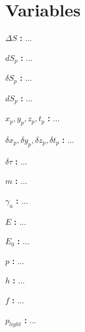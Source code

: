 \section{Variables}

\noindent ${\Delta S}$ \textbf{:}
...

\noindent ${dS_p}$ \textbf{:}
...

\noindent ${\delta S_p}$ \textbf{:}
...

\noindent ${dS_p}$ \textbf{:}
...

\noindent ${x_p},{y_p},{z_p},{t_p}$ \textbf{:}
...

\noindent ${\delta x_p},{\delta y_p},{\delta z_p},{\delta t_p}$ \textbf{:}
...

\noindent ${\delta\tau}$ \textbf{:}
...

\noindent ${m}$ \textbf{:}
...

\noindent ${\gamma_u}$ \textbf{:}
...

\noindent ${E}$ \textbf{:}
...

\noindent ${E_0}$ \textbf{:}
...

\noindent ${p}$ \textbf{:}
...

\noindent ${h}$ \textbf{:}
...

\noindent ${f}$ \textbf{:}
...

\noindent ${p_{light}}$ \textbf{:}
...